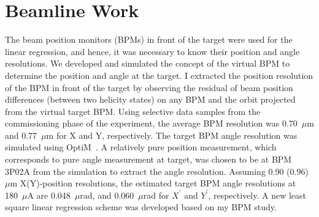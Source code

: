 \section{Beamline Work}

The beam position monitors (BPMs) in front of the target were used for the linear regression, and hence, it was necessary to know their position and angle resolutions.
We developed and simulated the concept of the virtual BPM to determine the position and angle at the target. 
I extracted the position resolution of the BPM in front of the target by observing the residual of beam position differences (between two helicity states) on any BPM and the orbit projected from the virtual target BPM. 
Using selective data samples from the commissioning phase of the experiment, the average BPM resolution was 0.70~$\mu$m and 0.77~$\mu$m for X and Y, respectively. 
The target BPM angle resolution was simulated using OptiM~\cite{OPTIM}. A relatively pure position measurement, which corresponds to pure angle measurement at target, was chosen to be at BPM 3P02A from the simulation to extract the angle resolution. Assuming 0.90 (0.96)~$\mu$m X(Y)-position resolutions, the estimated target BPM angle resolutions at 180~$\mu$A are 0.048~$\mu$rad, and 0.060~$\mu$rad for $X^{\prime}$ and $Y^{\prime}$, respectively.
A new least square linear regression scheme was developed based on my BPM study.


